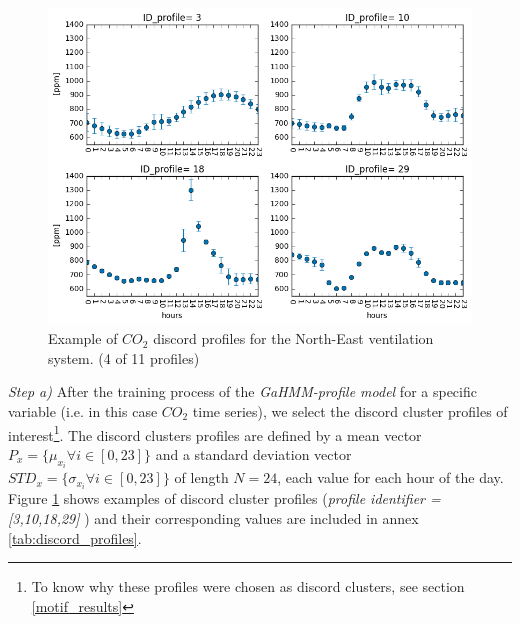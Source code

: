 \begin{figure}[h!]
  \vspace{0.5em} %
  \includegraphics[scale=0.6]{Figures/discord_candidates_CO2.jpg}
  \caption{Example of $CO_2$ discord profiles for the North-East ventilation system. (4 of 11 profiles)}
  \label{fig:discord_candidates} 
\end{figure}
    
\textit{Step a)} After the training process of the \textit{GaHMM-profile model} for a specific variable (i.e. in this case $CO_2$ time series), we select the discord cluster profiles of interest\footnote{To know why these profiles were chosen as discord clusters, see section \ref{motif_results}}. The discord clusters profiles are defined by a mean vector $P_x = \{ \mu_{x_i} \forall i \in [0,23] \}$ and a standard deviation vector $STD_x = \{ \sigma_{x_i} \forall i \in [0,23] \}$ of length $N=24$, each value for each hour of the day. Figure \ref{fig:discord_candidates} shows examples of discord cluster profiles (\textit{profile identifier = [3,10,18,29]} ) and their corresponding values are included in annex \ref{tab:discord_profiles}. 

